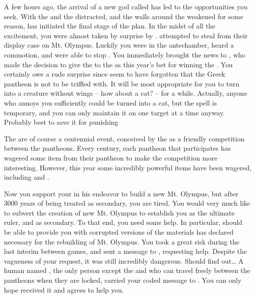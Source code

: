 \documentclass[char]{guardians}
\begin{document}
A few hours ago, the arrival of a new god called \cUnity{} has led to the opportunities you seek. With the \cCaretaker{} and the \cWarden{} distracted, and the walls around the \stone{} weakened for some reason, \cZeus{} has initiated the final stage of the plan. In the midst of all the excitement, you were almost taken by surprise by \cVal{}. \cVal{} attempted to steal \iSandals{\MYname} from their display case on Mt. Olympus. Luckily you were in the antechamber, heard a commotion, and were able to stop \cVal{\them}. You immediately brought the news to \cZeus{}, who made the decision to give the \iSandals{\MYname} to the \cCaretaker{} as this year's bet for winning the \pGames{}. You certainly owe \cVal{} a rude surprise since \cVal{\they} seem to have forgotten that the Greek pantheon is not to be triffled with. It will be most appropriate for you to turn \cVal{\them} into a creature without wings -- how about a cat? -- for a while. Actually, anyone who annoys you sufficiently could be turned into a cat, but the spell is temporary, and you can only maintain it on one target at a time anyway. Probably best to save it for punishing \cVal{}


The \pGames{} are of course a centennial event, conceived by the \cCaretaker{} as a friendly competition between the pantheons. Every century, each pantheon that participates has wagered some item from their pantheon to make the competition more interesting. However, this year some incredibly powerful items have been wagered, including \iSandals{\MYname} and \iHammer{\MYname}.

Now you support your \cZeus{\spouse} in his endeavor to build a new Mt. Olympus, but after 3000 years of being treated as secondary, you are tired.  You would very much like to subvert the creation of  new Mt. Olympus to establish you as the ultimate ruler, and \cZeus{} as secondary.  To that end, you need some help. In particular, \cOsiris{} should be able to provide you with corrupted versions of the materials \cHephaestus{} has declared necessary for the rebuilding of Mt. Olympus. You took a great risk during the last interim between games, and sent a message to \cOsiris{}, requesting \cOsiris{\their} help. Despite the vagueness of your request, it was still incredibly dangerous. Should \cZeus{} find out\ldots{} A human named \cJascha{}, the only person except the \cCaretaker{} and \cWarden{} who can travel freely between the pantheons when they are locked, carried your coded message to \cOsiris{}. You can only hope \cOsiris{\they} received it and agrees to help you.
\end{document}

